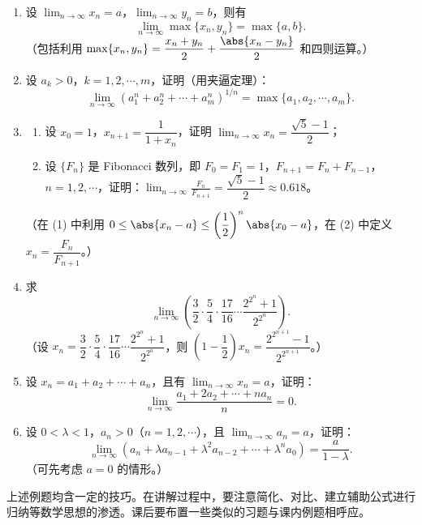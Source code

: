 \begin{enumerate}[label=\arabic*.]
  \item 设 $\displaystyle\lim_{n\to\infty}x_n=a$，$\displaystyle\lim_{n\to\infty}y_n=b$，则有
  \[
    \lim_{n\to\infty}\max\{x_n,y_n\}=\max\{a,b\}.
  \]
  （包括利用 $\max\{x_n,y_n\}=\dfrac{x_n+y_n}{2}+\dfrac{\abs{x_n-y_n}}2$ 和四则运算。）

  \item 设 $a_k>0$，$k=1,2,\cdots,m$，证明（用夹逼定理）：
  \[
    \lim_{n\to\infty}(a_1^n+a_2^n+\cdots+a_m^n)^{1/n}
    =\max\{a_1,a_2,\cdots,a_m\}.
  \]

  \item
  \begin{enumerate}[label=(\arabic*)]
    \item 设 $x_0=1$，$x_{n+1}=\dfrac1{1+x_n}$，证明 $\displaystyle\lim_{n\to\infty}x_n=\dfrac{\sqrt5-1}{2}$；
    \item 设 $\{F_n\}$ 是 Fibonacci 数列，即 $F_0=F_1=1$，$F_{n+1}=F_n+F_{n-1}$，$n=1,2,\cdots$，证明：$\displaystyle\lim_{n\to\infty}\frac{F_n}{F_{n+1}}=\dfrac{\sqrt5-1}{2}\approx0.618$。
  \end{enumerate}
  （在 (1) 中利用 $0\le\abs{x_n-a}\le\left(\dfrac12\right)^n\abs{x_0-a}$，在 (2) 中定义 $x_n=\dfrac{F_n}{F_{n+1}}$。）

  \item 求
  \[
    \lim_{n\to\infty}\left(\frac32\cdot\frac54\cdot\frac{17}{16}\cdots\frac{2^{2^n}+1}{2^{2^n}}\right).
  \]
  （设 $x_n=\dfrac32\cdot\dfrac54\cdot\dfrac{17}{16}\cdots\dfrac{2^{2^n}+1}{2^{2^n}}$，则 $\left(1-\dfrac12\right)x_n=\dfrac{2^{2^{n+1}}-1}{2^{2^{n+1}}}$。）

  \item 设 $x_n=a_1+a_2+\cdots+a_n$，且有 $\displaystyle\lim_{n\to\infty}x_n=a$，证明：
  \[
    \lim_{n\to\infty}\frac{a_1+2a_2+\cdots+na_n}{n}=0.
  \]

  \item 设 $0<\lambda<1$，$a_n>0$（$n=1,2,\cdots$），且 $\displaystyle\lim_{n\to\infty}a_n=a$，证明：
  \[
    \lim_{n\to\infty}(a_n+\lambda a_{n-1}+\lambda^2a_{n-2}+\cdots+\lambda^na_0)
    =\frac a{1-\lambda}.
  \]
  （可先考虑 $a=0$ 的情形。）
\end{enumerate}

\begin{xremark}
上述例题均含一定的技巧。在讲解过程中，要注意简化、对比、建立辅助公式进行归纳等数学思想的渗透。课后要布置一些类似的习题与课内例题相呼应。
\end{xremark}

